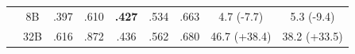 \begin{table}[t]
\begin{tabular}{>{\raggedright\arraybackslash}p{2.2cm}cccccccc}
 & 8B & .397 & .610 & \cellcolor[HTML]{D9EAF3}\textbf{.427} & .534 & .663 & \cellcolor{gray!20}4.7 \textcolor[HTML]{2166AC}{(-7.7)} & \cellcolor{gray!20}5.3 \textcolor[HTML]{2166AC}{(-9.4)} \\
 & 32B & .616 & .872 & \cellcolor[HTML]{D9EAF3}.436 & \cellcolor[HTML]{D9EAF3}.562 & .680 & \cellcolor{gray!10}46.7 \textcolor[HTML]{D6610A}{(+38.4)} & \cellcolor{gray!10}38.2 \textcolor[HTML]{D6610A}{(+33.5)} \\
\bottomrule
\end{tabular}
\end{table}
